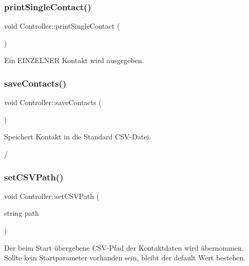 \subsubsection{\texorpdfstring{print\+Single\+Contact()}{printSingleContact()}}
{\footnotesize\ttfamily void Controller\+::print\+Single\+Contact (\begin{DoxyParamCaption}{ }\end{DoxyParamCaption})}



Ein E\+I\+N\+Z\+E\+L\+N\+ER Kontakt wird ausgegeben.

\mbox{\label{classContactManager_1_1Controller_a0d477334b1b20cbc8d7cc899dc69920e}} 
\subsubsection{\texorpdfstring{save\+Contacts()}{saveContacts()}}
{\footnotesize\ttfamily void Controller\+::save\+Contacts (\begin{DoxyParamCaption}{ }\end{DoxyParamCaption})}



Speichert Kontakt in die Standard C\+S\+V-\/\+Datei.

/ \mbox{\label{classContactManager_1_1Controller_a36ae8467ae2a00a693de08f3be42cda4}} 
\subsubsection{\texorpdfstring{set\+C\+S\+V\+Path()}{setCSVPath()}}
{\footnotesize\ttfamily void Controller\+::set\+C\+S\+V\+Path (\begin{DoxyParamCaption}\item[{string}]{path }\end{DoxyParamCaption})}



Der beim Start übergebene C\+S\+V-\/\+Pfad der Kontaktdaten wird übernommen. Sollte kein Startparameter vorhanden sein, bleibt der default Wert bestehen.


